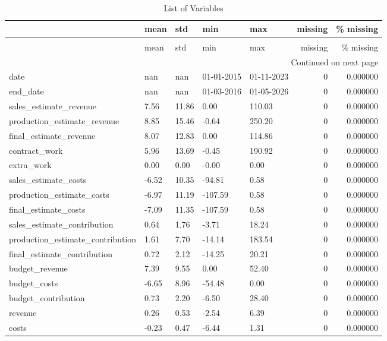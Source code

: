 \begin{landscape}\begin{longtable}[h!]{lllllrr}
\caption{List of Variables} \label{eda_1} \\
\toprule
 & mean & std & min & max & missing & \% missing \\
\midrule
\endfirsthead
\caption[]{List of Variables} \\
\toprule
 & mean & std & min & max & missing & \% missing \\
\midrule
\endhead
\midrule
\multicolumn{7}{r}{Continued on next page} \\
\midrule
\endfoot
\bottomrule
\endlastfoot
date & nan & nan & 01-01-2015 & 01-11-2023 & 0 & 0.000000 \\
end_date & nan & nan & 01-03-2016 & 01-05-2026 & 0 & 0.000000 \\
sales_estimate_revenue & 7.56 & 11.86 & 0.00 & 110.03 & 0 & 0.000000 \\
production_estimate_revenue & 8.85 & 15.46 & -0.64 & 250.20 & 0 & 0.000000 \\
final_estimate_revenue & 8.07 & 12.83 & 0.00 & 114.86 & 0 & 0.000000 \\
contract_work & 5.96 & 13.69 & -0.45 & 190.92 & 0 & 0.000000 \\
extra_work & 0.00 & 0.00 & -0.00 & 0.00 & 0 & 0.000000 \\
sales_estimate_costs & -6.52 & 10.35 & -94.81 & 0.58 & 0 & 0.000000 \\
production_estimate_costs & -6.97 & 11.19 & -107.59 & 0.58 & 0 & 0.000000 \\
final_estimate_costs & -7.09 & 11.35 & -107.59 & 0.58 & 0 & 0.000000 \\
sales_estimate_contribution & 0.64 & 1.76 & -3.71 & 18.24 & 0 & 0.000000 \\
production_estimate_contribution & 1.61 & 7.70 & -14.14 & 183.54 & 0 & 0.000000 \\
final_estimate_contribution & 0.72 & 2.12 & -14.25 & 20.21 & 0 & 0.000000 \\
budget_revenue & 7.39 & 9.55 & 0.00 & 52.40 & 0 & 0.000000 \\
budget_costs & -6.65 & 8.96 & -54.48 & 0.00 & 0 & 0.000000 \\
budget_contribution & 0.73 & 2.20 & -6.50 & 28.40 & 0 & 0.000000 \\
revenue & 0.26 & 0.53 & -2.54 & 6.39 & 0 & 0.000000 \\
costs & -0.23 & 0.47 & -6.44 & 1.31 & 0 & 0.000000 \\

\end{longtable}
\end{landscape}
